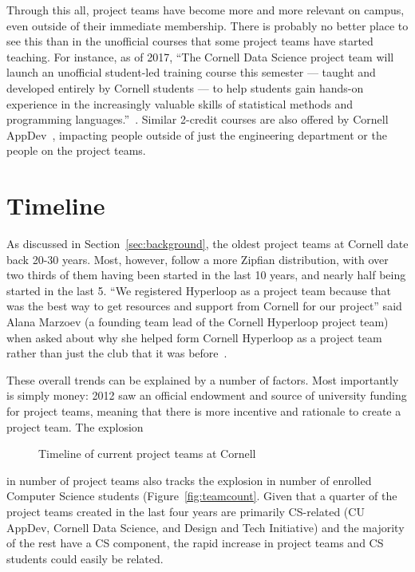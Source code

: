\documentclass[12pt]{article}
\begin{document}
Through this all, project teams have become more and more relevant on campus, even outside of their immediate membership.
There is probably no better place to see this than in the unofficial courses that some project teams have started teaching.
For instance, as of 2017, ``The Cornell Data Science project team will launch an unofficial student-led training course this semester — taught and developed entirely by Cornell students — to help students gain hands-on experience in the increasingly valuable skills of statistical methods and programming languages.''~\cite{si_cornell_2017}.
Similar 2-credit courses are also offered by Cornell AppDev~\cite{noauthor_cornell_2018-5}, impacting people outside of just the engineering department or the people on the project teams.

\section{Timeline}
\label{sec:timeline}

As discussed in Section~\ref{sec:background}, the oldest project teams at Cornell date back 20-30 years.
Most, however, follow a more Zipfian distribution, with over two thirds of them having been started in the last 10 years, and nearly half being started in the last 5.
``We registered Hyperloop as a project team because that was the best way to get resources and support from Cornell for our project'' said Alana Marzoev (a founding team lead of the Cornell Hyperloop project team) when asked about why she helped form Cornell Hyperloop as a project team rather than just the club that it was before~\cite{marzoev_rationale_2018}.

These overall trends can be explained by a number of factors.
Most importantly is simply money: 2012 saw an official endowment and source of university funding for project teams, meaning that there is more incentive and rationale to create a project team.
The explosion %
\begin{landscape} %
  \begin{figure} %
    \caption{Timeline of current project teams at Cornell} %
    \label{fig:timeline} %
  \end{figure} %
\end{landscape} %
\noindent in number of project teams also tracks the explosion in number of enrolled Computer Science students (Figure~\ref{fig:teamcount}.
Given that a quarter of the project teams created in the last four years are primarily CS-related (CU AppDev, Cornell Data Science, and Design and Tech Initiative) and the majority of the rest have a CS component, the rapid increase in project teams and CS students could easily be related.
\end{document}
